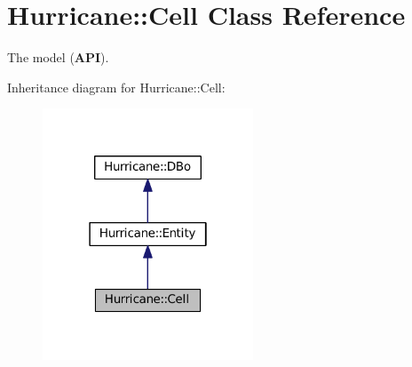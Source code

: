 \hypertarget{classHurricane_1_1Cell}{}\section{Hurricane\+:\+:Cell Class Reference}
\label{classHurricane_1_1Cell}


The model ({\bfseries A\+PI}).  




Inheritance diagram for Hurricane\+:\+:Cell\+:\nopagebreak
\begin{figure}[H]
\begin{center}
\leavevmode
\includegraphics[width=178pt]{classHurricane_1_1Cell__inherit__graph}
\end{center}
\end{figure}
